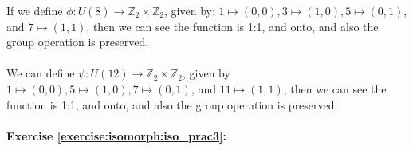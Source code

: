 \noindent If we define $\phi : U(8) \rightarrow {\mathbb Z}_2 \times {\mathbb Z}_2$, given by: $1\mapsto (0, 0), 3 \mapsto (1, 0), 5 \mapsto (0, 1)$, and $7 \mapsto (1, 1)$, then we can see the function is 1:1, and onto, and also the group operation is preserved. 
\\
\\
We can define $\psi: U(12) \rightarrow {\mathbb Z}_2 \times {\mathbb Z}_2$, given by $1\mapsto (0, 0), 5 \mapsto (1, 0), 7 \mapsto (0, 1)$, and $11 \mapsto (1, 1)$, then we can see the function is 1:1, and onto, and also the group operation is preserved. 
\\
\\

\noindent\textbf{Exercise \ref{exercise:isomorph:iso_prac3}:}
